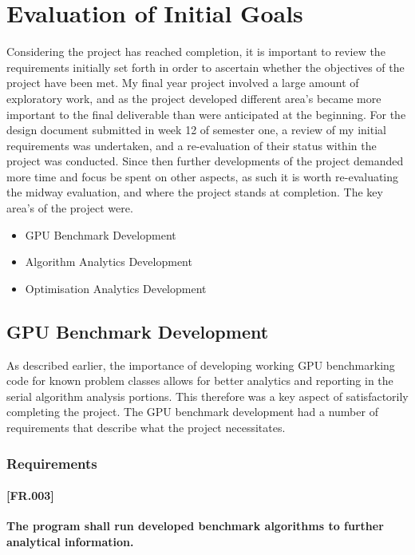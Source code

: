 
\section{Evaluation of Initial Goals}
Considering the project has reached completion, it is important to review the requirements initially
set forth in order to ascertain whether the objectives of the project have been met. My final year
project involved a large amount of exploratory work, and as the project developed different area's
became more important to the final deliverable than were anticipated at the beginning. For the
design document submitted in week 12 of semester one, a review of my initial requirements was
undertaken, and a re-evaluation of their status within the project was conducted. Since then further
developments of the project demanded more time and focus be spent on other aspects, as such it is
worth re-evaluating the midway evaluation, and where the project stands at completion. The key
area's of the project were.

\begin{itemize}
    \item GPU Benchmark Development
    \item Algorithm Analytics Development
    \item Optimisation Analytics Development
\end{itemize}

\subsection{GPU Benchmark Development}
As described earlier, the importance of developing working GPU benchmarking code for known problem
classes allows for better analytics and reporting in the serial algorithm analysis portions. This
therefore was a key aspect of satisfactorily completing the project. The GPU benchmark development
had a number of requirements that describe what the project necessitates.

\subsubsection{Requirements}

\paragraph{[FR.003]} \label{[FR.003]}
\textbf{The program shall run developed benchmark algorithms to further analytical information.}


